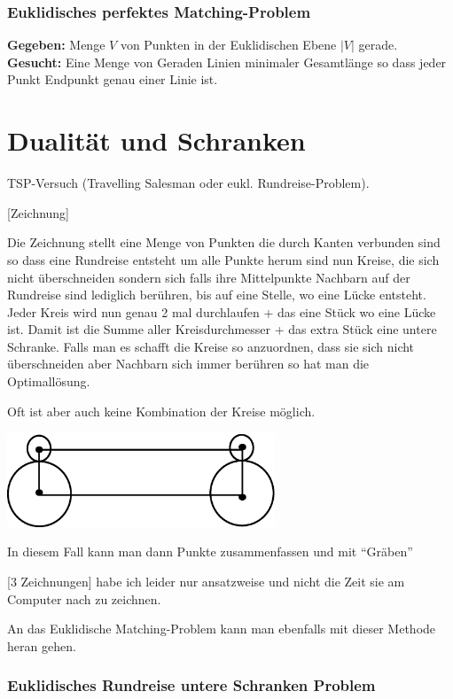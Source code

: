 \subsubsection{Euklidisches perfektes Matching-Problem}

{\bf Gegeben:} Menge $V$ von Punkten in der Euklidischen Ebene $|V|$ gerade.\\
{\bf Gesucht:} Eine Menge von Geraden Linien minimaler Gesamtlänge so dass
jeder Punkt Endpunkt genau einer Linie ist.

\section{Dualität und Schranken}

TSP-Versuch (Travelling Salesman oder eukl. Rundreise-Problem).

[Zeichnung]

Die Zeichnung stellt eine Menge von Punkten die durch Kanten verbunden sind
so dass eine Rundreise entsteht um alle Punkte herum sind nun Kreise, die
sich nicht überschneiden sondern sich falls ihre Mittelpunkte Nachbarn auf der Rundreise sind  lediglich berühren, bis auf eine
Stelle, wo eine Lücke entsteht. Jeder Kreis wird nun  genau 2 mal
durchlaufen + das eine Stück wo eine Lücke ist. Damit ist die Summe aller
Kreisdurchmesser + das extra Stück eine untere Schranke. Falls man es
schafft die Kreise so anzuordnen, dass sie sich nicht überschneiden aber
Nachbarn sich immer berühren so hat man die Optimallösung.

Oft ist aber auch keine Kombination der Kreise möglich.

\includegraphics[width=8cm]{bilder/1-2Kreisegehtnicht}

In diesem Fall kann man dann Punkte zusammenfassen und mit "`Gräben"'


[3 Zeichnungen] habe ich leider nur ansatzweise und nicht die Zeit sie am
Computer nach zu zeichnen.

An das Euklidische Matching-Problem kann man ebenfalls mit dieser Methode
heran gehen.

\subsubsection{Euklidisches Rundreise untere Schranken Problem}

